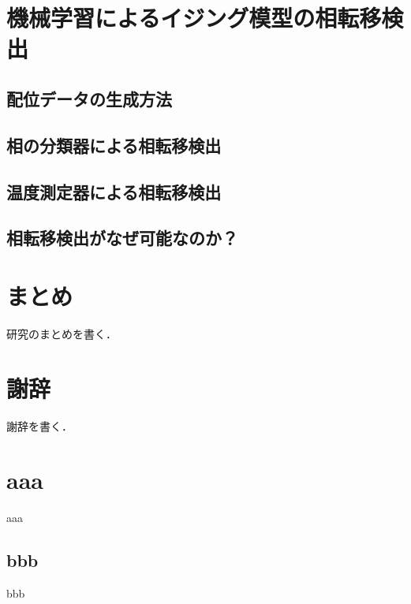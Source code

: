 \documentclass[a4paper,11pt]{jsreport}
\begin{document}
\chapter{機械学習によるイジング模型の相転移検出}
\section{配位データの生成方法}
\section{相の分類器による相転移検出}
\section{温度測定器による相転移検出}
\section{相転移検出がなぜ可能なのか？}



\chapter*{まとめ}
研究のまとめを書く．

\chapter*{謝辞} %
謝辞を書く．


\renewcommand{\bibname}{参考文献} %

\appendix
\renewcommand{\thechapter}{\Alph{chapter}}
\renewcommand{\thesection}{\Alph{chapter}.\arabic{section}}
\setcounter{section}{0}
\renewcommand{\theequation}{\Alph{chapter}.\arabic{equation}}
\setcounter{equation}{0}

\chapter{aaa}
aaa
\section{bbb}
bbb
\end{document}
